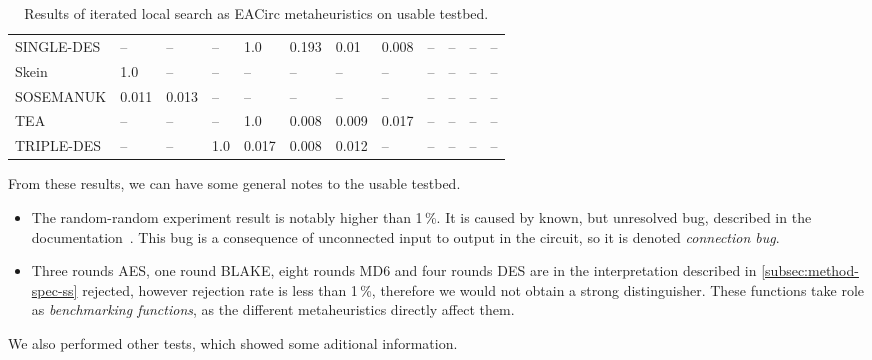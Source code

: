 \documentclass[
  print, %
  Table,   %
  nolof,     %
  nolot,     %
  11pt, %
  oneside  %
]{fithesis3}
\newcommand{\fd}{\cellcolor{red!13}}
\newcommand{\fn}{\cellcolor{green!13}}
\begin{document}
\begin{table}[H]
\begin{tabular}{l|l l l l l l l l l l l}
SINGLE-DES   & \fd{}--    & \fd{}--    & \fd{}--    & \fd{}1.0   & \fd{}0.193 & \fn{}0.01  & \fn{}0.008 & \fn{}--    & \fn{}--    & \fn{}--    & \fn{}--   \\
Skein        & \fd{}1.0   & \fn{}--    & \fn{}--    & \fn{}--    & \fn{}--    & \fn{}--    & \fn{}--    & \fn{}--    & \fn{}--    & \fn{}--    & \fn{}--   \\
SOSEMANUK    & \fn{}0.011 & \fn{}0.013 & \fn{}--    & \fn{}--    & \fn{}--    & \fn{}--    & \fn{}--    & \fn{}--    & \fn{}--    & \fn{}--    & \fn{}--   \\
TEA          & \fd{}--    & \fd{}--    & \fd{}--    & \fd{}1.0   & \fn{}0.008 & \fn{}0.009 & \fn{}0.017 & \fn{}--    & \fn{}--    & \fn{}--    & \fn{}--   \\
TRIPLE-DES   & \fd{}--    & \fd{}--    & \fd{}1.0   & \fn{}0.017 & \fn{}0.008 & \fn{}0.012 & \fn{}--    & \fn{}--    & \fn{}--    & \fn{}--    & \fn{}--   
\end{tabular}
\caption{Results of iterated local search as EACirc metaheuristics on usable testbed.}
\label{table:res-usable-ils}
\end{table}

From these results, we can have some general notes to the usable testbed.

\begin{itemize}
    \item The random-random experiment result is notably higher than 1\,\%. It is caused by known, but unresolved bug, described in the documentation~\cite{EACirc-wiki-bug}. This bug is a consequence of unconnected input to output in the circuit, so it is denoted \textit{connection bug}.
    \item Three rounds AES, one round BLAKE, eight rounds MD6 and four rounds DES are in the interpretation described in \cref{subsec:method-spec-ss} rejected, however rejection rate is less than 1\,\%, therefore we would not obtain a strong distinguisher. These functions take role as \textit{benchmarking functions}, as the different metaheuristics directly affect them.
\end{itemize}

We also performed other tests, which showed some aditional information.
\end{document}
